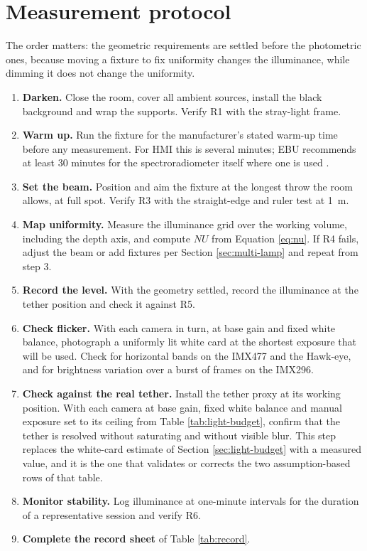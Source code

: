 \section{Measurement protocol}
\label{sec:protocol}

The order matters: the geometric requirements are settled before the photometric ones, because moving a fixture to fix uniformity changes the illuminance, while dimming it does not change the uniformity.

\begin{enumerate}
    \item \textbf{Darken.} Close the room, cover all ambient sources, install the black background and wrap the supports. Verify R1 with the stray-light frame.
    \item \textbf{Warm up.} Run the fixture for the manufacturer's stated warm-up time before any measurement. For HMI this is several minutes; EBU recommends at least 30 minutes for the spectroradiometer itself where one is used \cite{ebu_tech3355}.
    \item \textbf{Set the beam.} Position and aim the fixture at the longest throw the room allows, at full spot. Verify R3 with the straight-edge and ruler test at 1~m.
    \item \textbf{Map uniformity.} Measure the illuminance grid over the working volume, including the depth axis, and compute $NU$ from Equation \ref{eq:nu}. If R4 fails, adjust the beam or add fixtures per Section \ref{sec:multi-lamp} and repeat from step 3.
    \item \textbf{Record the level.} With the geometry settled, record the illuminance at the tether position and check it against R5.
    \item \textbf{Check flicker.} With each camera in turn, at base gain and fixed white balance, photograph a uniformly lit white card at the shortest exposure that will be used. Check for horizontal bands on the IMX477 and the Hawk-eye, and for brightness variation over a burst of frames on the IMX296.
    \item \textbf{Check against the real tether.} Install the tether proxy at its working position. With each camera at base gain, fixed white balance and manual exposure set to its ceiling from Table \ref{tab:light-budget}, confirm that the tether is resolved without saturating and without visible blur. This step replaces the white-card estimate of Section \ref{sec:light-budget} with a measured value, and it is the one that validates or corrects the two assumption-based rows of that table.
    \item \textbf{Monitor stability.} Log illuminance at one-minute intervals for the duration of a representative session and verify R6.
    \item \textbf{Complete the record sheet} of Table \ref{tab:record}.
\end{enumerate}

